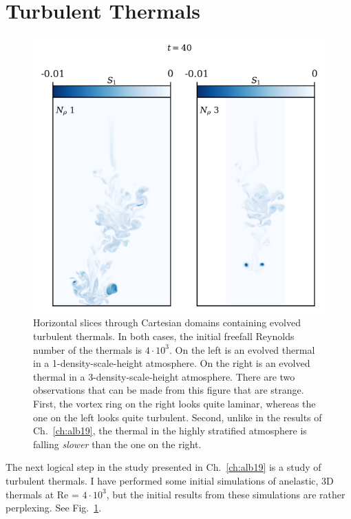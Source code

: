 \section{Turbulent Thermals}
\label{sec:turb_thermals}
\begin{figure}[p!]
    \includegraphics[width=\textwidth]{figs/unpublished/turbulent_thermals.pdf}
    \caption[Evolved Turbulent Thermals]{
	Horizontal slices through Cartesian domains containing evolved turbulent thermals.
	In both cases, the initial freefall Reynolds number of the thermals is $4\cdot10^3$.
	On the left is an evolved thermal in a 1-density-scale-height atmosphere.
	On the right is an evolved thermal in a 3-density-scale-height atmosphere.
	There are two observations that can be made from this figure that are strange.
	First, the vortex ring on the right looks quite laminar, whereas the one on the left looks quite turbulent.
	Second, unlike in the results of Ch.~\ref{ch:alb19}, the thermal in the highly stratified atmosphere is falling \emph{slower} than the one on the right.
    \label{fig:turbulent_thermals} }
\end{figure}


The next logical step in the study presented in Ch.~\ref{ch:alb19} is a study of turbulent thermals.
I have performed some initial simulations of anelastic, 3D thermals at Re = $4 \cdot 10^3$, but the initial results from these simulations are rather perplexing.
See Fig.~\ref{fig:turbulent_thermals}.


